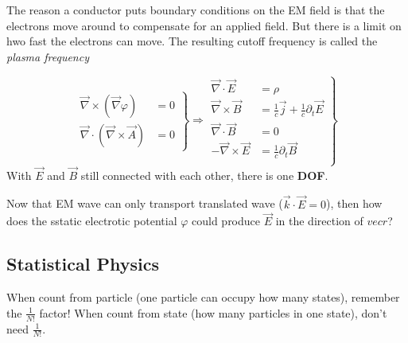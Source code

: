 The reason a conductor puts boundary conditions on the EM field is that the
electrons move around to compensate for an applied field. But there is a
limit on hwo fast the electrons can move. The resulting cutoff frequency is
called the \textit{plasma frequency}
\begin{description}[style=nextline]
    \item [Maxwell Eqn] 
	\begin{equation}
	    \left.
	    \begin{aligned}
		\overrightarrow{\nabla} \times (\overrightarrow{\nabla} \varphi) &= 0 \\
		\overrightarrow{\nabla} \cdot (\overrightarrow{\nabla} \times \overrightarrow{A}) &= 0
	    \end{aligned}
	    \right\} 
	    \Rightarrow 
	    \left.
	    \begin{aligned}
		\overrightarrow{\nabla} \cdot \overrightarrow{E} &= \rho \\
		\overrightarrow{\nabla} \times \overrightarrow{B} &=
		\frac{1}{c} \overrightarrow{j} + \frac{1}{c}\partial_{t}\overrightarrow{E}   \\
		\overrightarrow{\nabla} \cdot \overrightarrow{B} &= 0	\\
		-\overrightarrow{\nabla} \times \overrightarrow{E} &=
		\frac{1}{c} \partial_{t}\overrightarrow{B}   \\
	    \end{aligned}
	    \right\}	
	\end{equation}
	With $\overrightarrow{E}$ and $\overrightarrow{B}$ still connected
	with each other, there is one \textbf{DOF}.
\end{description}

Now that EM wave can only transport translated wave ($\vec{k}\cdot\vec{E} =0$), then
how does the sstatic electrotic potential $\varphi$ could produce $\vec{E}$ in
the direction of $vec{r}$?


\subsection{Statistical Physics}
\begin{description}[style=nextline]
    \item [Partisian func] When count from particle (one particle can occupy
	how many states), remember the $\frac{1}{N!}$ factor! When count from
	state (how many particles in one state), don't need $\frac{1}{N!}$.
\end{description}

